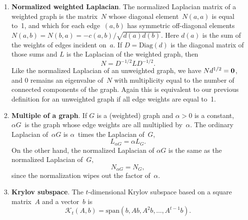 \documentclass[11pt]{article}
\newcommand{\m}[1]{{\bf{#1}}}       %
\newcommand{\zeros}{\m0}            %
\newcommand{\Diag}{\mbox{Diag}}
\newcommand{\krylov}{\mathcal{K}}   %
\begin{document}
\begin{enumerate}
\item\label{wnorm}{\bf Normalized weighted Laplacian}.
The normalized Laplacian matrix of a weighted graph is the matrix~$N$
whose diagonal element~$N(a,a)$ is equal to~1,
and which for each edge~$(a,b)$ has symmetric off-diagonal elements 
$N(a,b) = N(b,a) = -c(a,b)/\sqrt{d(a)d(b)}$.
Here $d(a)$ is the sum of the weights of edges incident on~$a$.
If $D = \Diag(d)$ is the diagonal matrix of those sums
and $L$ is the Laplacian of the weighted graph, then
$$N = D^{-1/2}LD^{-1/2}.$$
Like the normalized Laplacian of an unweighted graph, 
we have $Nd^{1/2}=\zeros$, 
and 0 remains an eigenvalue of~$N$ with multiplicity equal to the 
number of connected components of the graph.
Again this is equivalent to our previous definition for an unweighted graph
if all edge weights are equal to~1.

\item {\bf Multiple of a graph}.
If $G$ is a (weighted) graph and $\alpha>0$ is a constant, $\alpha G$~is the
graph whose edge weights are all multiplied by~$\alpha$.
The ordinary Laplacian of~$\alpha G$ is $\alpha$~times the Laplacian of~$G$,
$$L_{\alpha G} = \alpha L_G.$$ 
On the other hand, the normalized Laplacian of $\alpha G$ is the same as the
normalized Laplacian of~$G$, 
$$N_{\alpha G} = N_G,$$ 
since the normalization wipes out the factor of~$\alpha$.

\item{\bf Krylov subspace}.
The $t$-dimensional Krylov subspace based on a square matrix~$A$ 
and a vector~$b$ is 
$$\krylov_t(A,b) = \mbox{span}(b,Ab,A^2b,\ldots,A^{t-1}b).$$


\end{enumerate}
\end{document}
